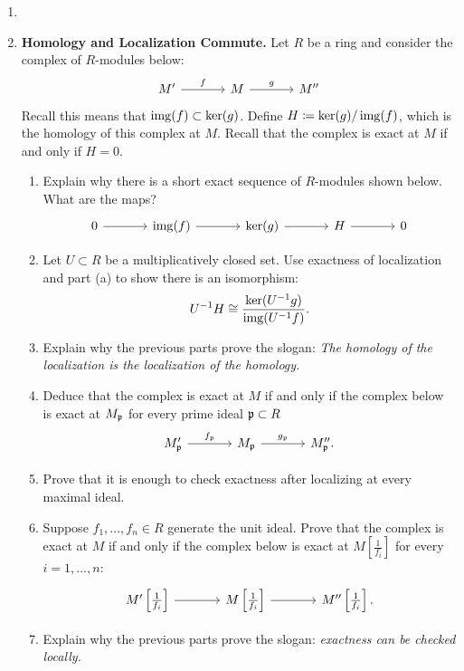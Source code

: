 \documentclass[Notebook.tex]{subfiles}
\begin{document}
\begin{enumerate}[leftmargin=*, series=problems]

\item 

\item \textbf{Homology and Localization Commute.} Let $R$ be a ring and consider the complex of $R$-modules below:
\[
\begin{tikzcd}[row sep = .3em, column sep = 3.5em]
M' \arrow[r, "f"] & M \arrow[r, "g"] & M''
\end{tikzcd}
\]
Recall this means that $\operatorname{img}(f) \subset \ker(g)$. Define $H\coloneqq \ker(g)/\operatorname{img}(f)$, which is the homology of this complex at $M$. Recall that the complex is exact at $M$ if and only if $H=0$.
\begin{enumerate}
   \item  Explain why there is a short exact sequence of $R$-modules shown below. What are the maps?
   \[
\begin{tikzcd}[row sep = .3em, column sep = 3.5em]
0 \arrow[r] & \img(f) \arrow[r] & \ker(g) \arrow[r] & H \arrow[r] & 0
\end{tikzcd}
\]
    \item Let $U\subset R$ be a multiplicatively closed set. Use exactness of localization and part (a) to show there is an isomorphism:
    \[
    U^{-1}H\cong \frac{\ker(U^{-1}g)}{\operatorname{img}(U^{-1}f)}.
    \]
    \item Explain why the previous parts prove the slogan: \textit{The homology of the localization is the localization of the homology.}
    \item Deduce that the complex is exact at $M$ if and only if the complex below is exact at $M_{\operatorname{\mathfrak{p}}}$ for every prime ideal $\operatorname{\mathfrak{p}}\subset R$
    \[
\begin{tikzcd}[row sep = .3em, column sep = 3.5em]
    M'_{\fp} \arrow[r, "f_{\fp}"] & M_{\fp} \arrow[r, "g_{\fp}"] & M''_{\fp}.
    \end{tikzcd}
    \]
    \item Prove that it is enough to check exactness after localizing at every maximal ideal.
    \item Suppose $f_1,\ldots,f_n\in R$ generate the unit ideal. Prove that the complex is exact at $M$ if and only if the complex below is exact at $M[\frac{1}{f_{i}}]$ for every $i=1,\ldots,n$:
    \[
    \begin{tikzcd}[column sep=large]
    M'\left[\frac{1}{f_{i}}\right] \arrow[r] & M\left[\frac{1}{f_{i}}\right] \arrow[r] & M''\left[\frac{1}{f_{i}}\right].
    \end{tikzcd}
    \]
    \item Explain why the previous parts prove the slogan: \textit{exactness can be checked locally.}
\end{enumerate}


\end{enumerate}
\end{document}
